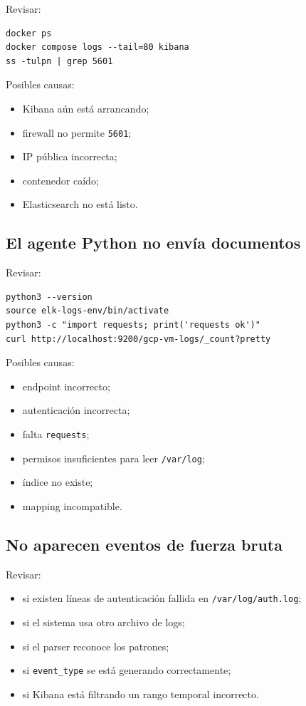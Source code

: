 \documentclass[
  coursetitle={Cómputo Nube y Tecnologías Emergentes},
  coursehours={96},
  coursedate={Verano 2026},
  doctype={Práctica},
  otherlangs={english,french},
  authorname={Lázaro},
  authorsurname={Bustio-Martínez},
  authortitle={PhD},
  role={Profesor Investigador},
  email={lbustio@inaoe.mx},
  phone={5559504000},
  ext={7459},
  institution={Instituto Nacional de Astrofísica, Óptica y Electrónica (INAOE)},
  department={Maestría en Ciencias en Tecnologías de Seguridad},
  address={Luis Enrique Erro 1, Sta. Ma. Tonantzintla, San Andrés Cholula, CP 72840, Puebla, México},
  margin={0.5in}
]{../../lbustio_lecture_notes}
\begin{document}
Revisar:

\begin{lstlisting}
docker ps
docker compose logs --tail=80 kibana
ss -tulpn | grep 5601
\end{lstlisting}

Posibles causas:

\begin{itemize}
    \item Kibana aún está arrancando;
    \item firewall no permite \texttt{5601};
    \item IP pública incorrecta;
    \item contenedor caído;
    \item Elasticsearch no está listo.
\end{itemize}

\subsection{El agente Python no envía documentos}

Revisar:

\begin{lstlisting}
python3 --version
source elk-logs-env/bin/activate
python3 -c "import requests; print('requests ok')"
curl http://localhost:9200/gcp-vm-logs/_count?pretty
\end{lstlisting}

Posibles causas:

\begin{itemize}
    \item endpoint incorrecto;
    \item autenticación incorrecta;
    \item falta \texttt{requests};
    \item permisos insuficientes para leer \texttt{/var/log};
    \item índice no existe;
    \item mapping incompatible.
\end{itemize}

\subsection{No aparecen eventos de fuerza bruta}

Revisar:

\begin{itemize}
    \item si existen líneas de autenticación fallida en \texttt{/var/log/auth.log};
    \item si el sistema usa otro archivo de logs;
    \item si el parser reconoce los patrones;
    \item si \texttt{event\_type} se está generando correctamente;
    \item si Kibana está filtrando un rango temporal incorrecto.
\end{itemize}
\end{document}
